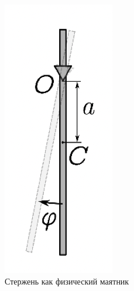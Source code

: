 \documentclass[a4paper,12pt]{article} %
\begin{document}
\begin{figure} 
\vspace{-5ex}
\includegraphics[width=\linewidth]{Маятник1}
\caption{Стержень как физический маятник}
\label{fig:somelabel}
\end{figure}
\end{document}
